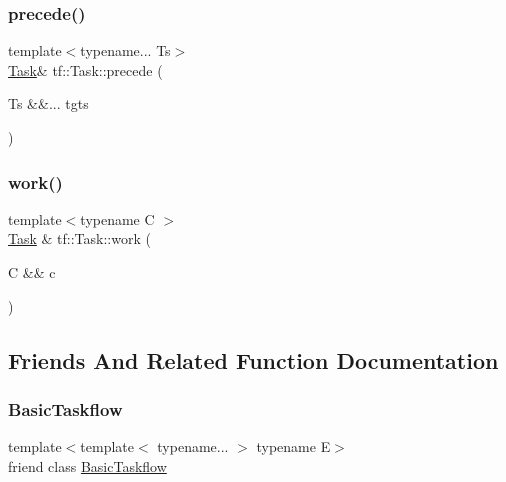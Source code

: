 \mbox{\label{classtf_1_1Task_ac8055e2fc0d0a578be87522fff496b55}} 
\subsubsection{\texorpdfstring{precede()}{precede()}\hspace{0.1cm}{\footnotesize\ttfamily [2/2]}}
{\footnotesize\ttfamily template$<$typename... Ts$>$ \\
\hyperlink{classtf_1_1Task}{Task}\& tf\+::\+Task\+::precede (\begin{DoxyParamCaption}\item[{Ts \&\&...}]{tgts }\end{DoxyParamCaption})}

\mbox{\label{classtf_1_1Task_a085349bd9ad5066579ce450c7bc78406}} 
\subsubsection{\texorpdfstring{work()}{work()}}
{\footnotesize\ttfamily template$<$typename C $>$ \\
\hyperlink{classtf_1_1Task}{Task} \& tf\+::\+Task\+::work (\begin{DoxyParamCaption}\item[{C \&\&}]{c }\end{DoxyParamCaption})\hspace{0.3cm}{\ttfamily [inline]}}



\subsection{Friends And Related Function Documentation}
\mbox{\label{classtf_1_1Task_ab3ad8c5c7ed22c3fbd8a41b84db75083}} 
\subsubsection{\texorpdfstring{Basic\+Taskflow}{BasicTaskflow}}
{\footnotesize\ttfamily template$<$template$<$ typename... $>$ typename E$>$ \\
friend class \hyperlink{classtf_1_1BasicTaskflow}{Basic\+Taskflow}\hspace{0.3cm}{\ttfamily [friend]}}

